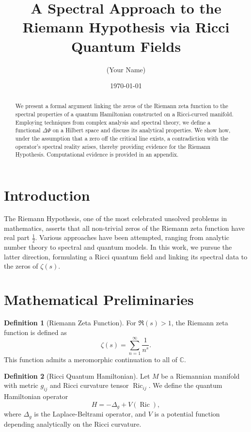 \documentclass[12pt]{article}
\title{A Spectral Approach to the Riemann Hypothesis via Ricci Quantum Fields}
\author{(Your Name)}
\date{\today}
\theoremstyle{definition}
\newtheorem{definition}{Definition}
\begin{document}
\maketitle

\begin{abstract}
We present a formal argument linking the zeros of the Riemann zeta function to the spectral properties of a quantum Hamiltonian constructed on a Ricci-curved manifold. Employing techniques from complex analysis and spectral theory, we define a functional $\Delta\Psi$ on a Hilbert space and discuss its analytical properties. We show how, under the assumption that a zero off the critical line exists, a contradiction with the operator's spectral reality arises, thereby providing evidence for the Riemann Hypothesis. Computational evidence is provided in an appendix.
\end{abstract}

\section{Introduction}

The Riemann Hypothesis, one of the most celebrated unsolved problems in mathematics, asserts that all non-trivial zeros of the Riemann zeta function have real part $\frac{1}{2}$. Various approaches have been attempted, ranging from analytic number theory to spectral and quantum models. In this work, we pursue the latter direction, formulating a Ricci quantum field and linking its spectral data to the zeros of $\zeta(s)$.

\section{Mathematical Preliminaries}

\begin{definition}[Riemann Zeta Function]
For $\Re(s) > 1$, the Riemann zeta function is defined as
\[
\zeta(s) = \sum_{n=1}^{\infty} \frac{1}{n^s}.
\]
This function admits a meromorphic continuation to all of $\mathbb{C}$.
\end{definition}

\begin{definition}[Ricci Quantum Hamiltonian]
Let $M$ be a Riemannian manifold with metric $g_{ij}$ and Ricci curvature tensor $\operatorname{Ric}_{ij}$. We define the quantum Hamiltonian operator
\[
H = -\Delta_g + V(\operatorname{Ric}),
\]
where $\Delta_g$ is the Laplace-Beltrami operator, and $V$ is a potential function depending analytically on the Ricci curvature.
\end{definition}
\end{document}
